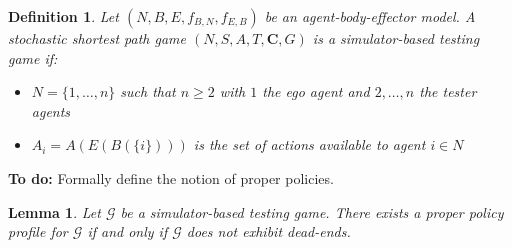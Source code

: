 \documentclass[10pt]{article}
\theoremstyle{plain}
\newtheorem{definition}{Definition}
\newtheorem{lemma}{Lemma}
\newcommand{\vect}[1]{\bm{#1}}
\newenvironment{note}[1][Note]{
    \begin{center}
    	\begin{minipage}{0.9\linewidth}
    		\begin{mdframed}[backgroundcolor=yellow!25,linewidth=0pt]
    			\textbf{#1:} }{
    		\end{mdframed}
    	\end{minipage}
    \end{center}
}
\begin{document}
%

\begin{definition}\label{definition:game}
    Let $(N, B, E, f_{B,N}, f_{E,B})$ be an agent-body-effector model.
    A stochastic shortest path game $(N, S, A, T, \vect{C}, G)$ is a simulator-based testing game if:
    \begin{itemize}
        \item $N = \{ 1, \dots, n \}$ such that $n \ge 2$ with $1$ the ego agent and $2, \dots, n$ the tester agents
        \item $A_{i} = A(E(B(\{ i \})))$ is the set of actions available to agent $i \in N$
    \end{itemize}
\end{definition}

\begin{note}[To do]
    Formally define the notion of proper policies.
\end{note}

\begin{lemma}\label{lemma:dead_ends}
    Let $\mathcal{G}$ be a simulator-based testing game.
    There exists a proper policy profile for $\mathcal{G}$ if and only if $\mathcal{G}$ does not exhibit dead-ends.
\end{lemma}
\end{document}
